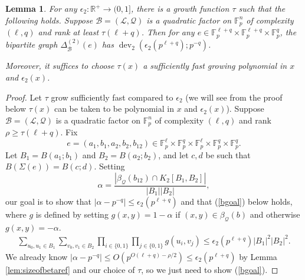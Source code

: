 \documentclass[12pt,oneside,british,a4wide]{amsart}
\newtheorem{lemma}[theorem]{Lemma}
\numberwithin{equation}{section}
\theoremstyle{definition}
\def\F{\mathbb{F}}
\def\e{\epsilon}
\newcommand{\calL}{\mathcal{L}}
\newcommand{\calB}{\mathcal{B}}
\newcommand{\calQ}{\mathcal{Q}}
\def\dev{\operatorname{dev}}
\begin{document}
\begin{lemma}\label{lem:formqr}
For any $\e_2:\mathbb{R}^+\rightarrow (0,1]$, there is a growth function $\tau$ such that the following holds.  Suppose $\calB=(\calL,\calQ)$ is a quadratic factor on $\F_p^n$ of complexity $(\ell,q)$ and rank at least $\tau(\ell+q)$.  Then for any  $e\in \F_p^{\ell+q}\times \F_p^{\ell+q}\times \F_p^q$, the bipartite graph $\Delta_{\calB}^{(2)}(e)$ has $\dev_2(\e_2(p^{\ell+q}); p^{-q})$.  

Moreover,  it suffices to choose $\tau(x)$ a sufficiently fast growing polynomial in $x$ and $\e_2(x)$.  
\end{lemma}
\begin{proof}
Let $\tau$ grow sufficiently fast compared to $\e_2$ (we will see from the proof below $\tau(x)$ can be taken to be polynomial in $x$ and $\e_2(x)$). Suppose $\calB=(\calL,\calQ)$ is a quadratic factor on $\F_p^n$ of complexity $(\ell,q)$ and rank $\rho\geq \tau(\ell+q)$.  Fix 
$$
e=(a_1,b_1,a_2,b_2,b_{12})\in \F_p^{\ell}\times \F_p^{q}\times  \F_p^{\ell}\times \F_p^{q}\times \F_p^q.
$$
  Let $B_1=B(a_1;b_1)$ and $B_2=B(a_2;b_2)$, and let $c,d$ be such that $B(\Sigma(e))=B(c;d)$.  Setting 
  $$
  \alpha=\frac{|\beta_{\calQ}(b_{12})\cap K_2[B_1,B_2]|}{|B_1||B_2|},
  $$
   our goal is to show that $|\alpha-p^{-q}|\leq \e_2(p^{\ell+q})$ and that (\ref{bgoal}) below holds, where $g$ is defined by setting $g(x,y)=1-\alpha$ if $(x,y)\in \beta_{\calQ}(b)$ and otherwise $g(x,y)=-\alpha$.  
 \begin{align}\label{bgoal}
 \sum_{u_0,u_1\in B_1}\sum_{v_0,v_1\in B_2}\prod_{i\in \{0,1\}}\prod_{j\in \{0,1\}}g(u_i,v_j) \leq \e_2(p^{\ell+q})|B_1|^2|B_2|^2.
 \end{align}
 We already know $|\alpha-p^{-q}|\leq O(p^{O(\ell+q)-\rho/2})\leq \e_2(p^{\ell+q})$ by Lemma \ref{lem:sizeofbetaref} and our choice of $\tau$, so we just need to show (\ref{bgoal}).  


\end{proof}
\end{document}
